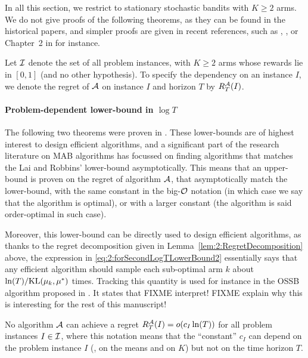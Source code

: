 In all this section, we restrict to stationary stochastic bandits with $K\geq2$ arms.
We do not give proofs of the following theorems, as they can be found in the historical papers, and simpler proofs are given in recent references, such as \cite{Bubeck12}, \cite{LattimoreBanditAlgorithmsBook}, or Chapter~2 in \cite{Slivkins2019} for instance.

Let $\mathcal{I}$ denote the set of all problem instances, with $K \geq 2$ arms whose rewards lie in $[0,1]$ (and no other hypothesis).
To specify the dependency on an instance $I$, we denote the regret of $\mathcal{A}$ on instance $I$ and horizon $T$ by $R_T^{\mathcal{A}}(I)$.


\paragraph{Problem-dependent lower-bound in $\log T$}

The following two theorems were proven in \cite{LaiRobbins85}.
These lower-bounds are of highest interest to design efficient algorithms,
and a significant part of the research literature on MAB algorithms has focussed on finding algorithms that matches the Lai and Robbins' lower-bound asymptotically.
This means that an upper-bound is proven on the regret of algorithm $\mathcal{A}$, that asymptotically match the lower-bound, with the same constant in the big-$\mathcal{O}$ notation (in which case we say that the algorithm is optimal), or with a larger constant (the algorithm is said order-optimal in such case).

Moreover, this lower-bound can be directly used to design efficient algorithms, as thanks to the regret decomposition given in Lemma~\ref{lem:2:RegretDecomposition} above, the expression in \eqref{eq:2:forSecondLogTLowerBound2} essentially says that any efficient algorithm
should sample each sub-optimal arm $k$ about $\ln(T)/\mathrm{KL}(\mu_k,\mu^*)$ times.
Tracking this quantity is used for instance in the OSSB algorithm proposed in \cite{Combes17}.
It states that FIXME interpret!
FIXME explain why this is interesting for the rest of this manuscript!

\begin{theorem}\label{thm:2:firstLogTLowerBound}
    No algorithm $\mathcal{A}$ can achieve a regret $R_T^{\mathcal{A}}(I) = \mathop{}\mathopen{}o\mathopen{}\left(c_I \ln(T)\right)$ for all problem instances $I \in \mathcal{I}$,
    where this notation means that the ``constant'' $c_I$ can depend on the problem instance $I$ (\eg, on the means and on $K$) but not on the time horizon $T$.
\end{theorem}

